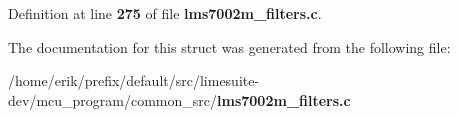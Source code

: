 Definition at line {\bf 275} of file {\bf lms7002m\+\_\+filters.\+c}.



The documentation for this struct was generated from the following file\+:\begin{DoxyCompactItemize}
\item 
/home/erik/prefix/default/src/limesuite-\/dev/mcu\+\_\+program/common\+\_\+src/{\bf lms7002m\+\_\+filters.\+c}\end{DoxyCompactItemize}
